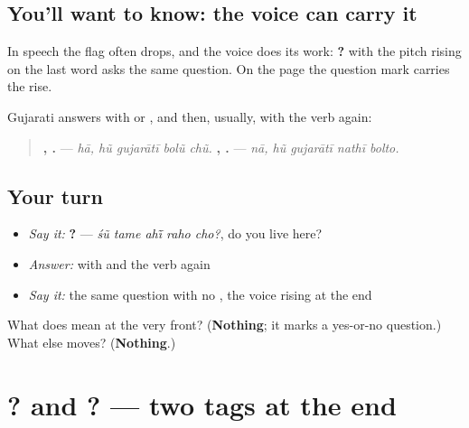 \subsection*{You'll want to know: the voice can carry it}
In speech the flag often drops, and the voice does its work: \textbf{   ?} with the pitch rising on the last word asks the same question. On the page the question mark carries the rise.

\begin{grammarlens}[title={Grammar Lens: answering}]
Gujarati answers with \textbf{} or \textbf{}, and then, usually, with the verb again:

\begin{quote}
\textbf{,    .} — \emph{hā, hũ gujarātī bolũ chũ.} \textbf{,    .} — \emph{nā, hũ gujarātī nathī bolto.}
\end{quote}
\end{grammarlens}

\subsection*{Your turn}
\begin{itemize}
\raggedright
  \item \emph{Say it:} \textbf{    ?} — \emph{śũ tame ahī̃ raho cho?}, do you live here?
  \item \emph{Answer:} with \textbf{} and the verb again
  \item \emph{Say it:} the same question with no \textbf{}, the voice rising at the end
\end{itemize}

\begin{tcolorbox}[breakable,colback=teal!4,colframe=teal!35!black,title={Before you move on}]
What does \textbf{} mean at the very front? (\textbf{Nothing}; it marks a yes-or-no question.) What else moves? (\textbf{Nothing}.)
\end{tcolorbox}
\section[\texorpdfstring{… \gu{કે} \gu{નહીં}? · …, \gu{ખરું}? (… ke nahī̃? · … …)}{… કે નહીં? · …, ખરું? (… ke nahī̃? · … …)}]{ ? and ? — two tags at the end}

\label{lesson:GU-C146-ke-nahi}



